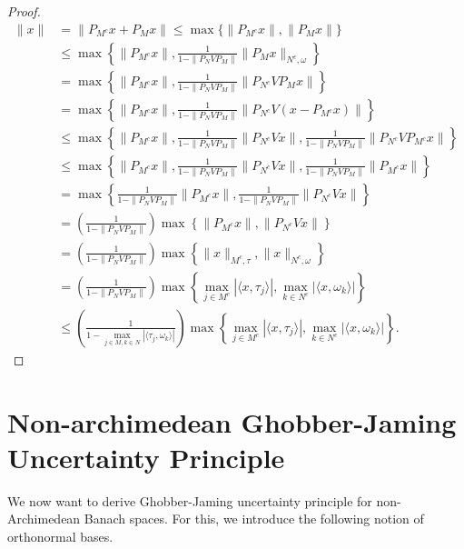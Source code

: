 \documentclass{amsart}
\begin{document}
\begin{proof}
\begin{align*}
	\|x\|&=\|P_{M^c}x+P_Mx\|\leq \max\{\|P_{M^c}x\|, \|P_Mx\|\}\\
	&\leq \max \left\{\|P_{M^c}x\|, \frac{1}{1-\|P_NVP_M\|}	\|P_Mx\|_{N^c, \omega}\right\} \\
	&= \max \left\{\|P_{M^c}x\|, \frac{1}{1-\|P_NVP_M\|}	\|P_{N^c}VP_Mx\|\right\} \\
	&=\max \left\{\|P_{M^c}x\|, \frac{1}{1-\|P_NVP_M\|}	\|P_{N^c}V(x-P_{M^c}x)\|\right\} \\
	&\leq \max \left\{\|P_{M^c}x\|, \frac{1}{1-\|P_NVP_M\|}	\|P_{N^c}Vx\|, \frac{1}{1-\|P_NVP_M\|}	\|P_{N^c}VP_{M^c}x\|\right\} \\
	&\leq \max \left\{\|P_{M^c}x\|, \frac{1}{1-\|P_NVP_M\|}	\|P_{N^c}Vx\|, \frac{1}{1-\|P_NVP_M\|}	\|P_{M^c}x\|\right\} \\
	&=\max \left\{\frac{1}{1-\|P_NVP_M\|}	\|P_{M^c}x\|, \frac{1}{1-\|P_NVP_M\|}	\|P_{N^c}Vx\|\right\} \\
	&=\left(\frac{1}{1-\|P_NVP_M\|}\right)\max \left\{\|P_{M^c}x\|, \|P_{N^c}Vx\|\right\} \\
 &=\left(\frac{1}{1-\|P_NVP_M\|}\right)\max \left\{\|x\|_{M^c, \tau}, \|x\|_{N^c, \omega}\right\} \\
 &=\left(\frac{1}{1-\|P_NVP_M\|}\right) \max\left\{\displaystyle \max_{j \in M^c}|\langle x, \tau_j\rangle |, \displaystyle \max_{k \in N^c}|\langle x, \omega_k\rangle |\right\}\\
 &\leq \left(\frac{1}{1-\displaystyle \max_{j \in M, k \in N}|\langle \tau_j, \omega_k \rangle|}\right)\max\left\{\displaystyle \max_{j \in M^c}|\langle x, \tau_j\rangle |, \displaystyle \max_{k \in N^c}|\langle x, \omega_k\rangle |\right\}.
\end{align*}
\end{proof}



\section{Non-archimedean  Ghobber-Jaming Uncertainty Principle}
We now want to derive Ghobber-Jaming uncertainty principle for non-Archimedean Banach spaces. For this, we introduce the following notion of orthonormal bases. 
\end{document}
